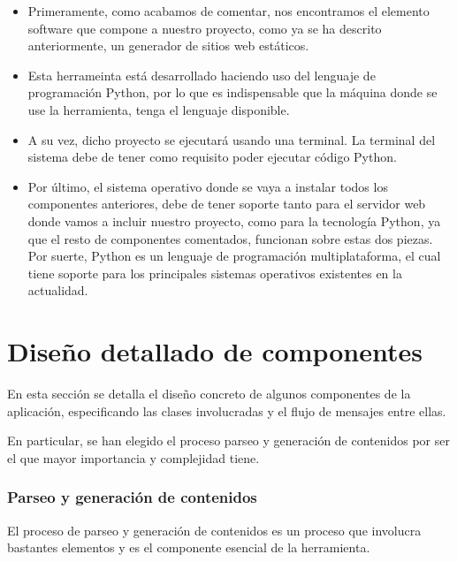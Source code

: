 \begin{itemize}
    \item Primeramente, como acabamos de comentar, nos encontramos el elemento software que
        compone a nuestro proyecto, como ya se ha descrito anteriormente, un generador de sitios web estáticos.
    \item Esta herrameinta está desarrollado haciendo uso del lenguaje de programación Python, por lo que es
        indispensable que la máquina donde se use la herramienta, tenga el lenguaje disponible.
    \item A su vez, dicho proyecto se ejecutará usando una terminal. La terminal del sistema debe de
        tener como requisito poder ejecutar código Python.
    \item Por último, el sistema operativo donde se vaya a instalar todos los componentes anteriores,
        debe de tener soporte tanto para el servidor web donde vamos a incluir nuestro proyecto,
        como para la tecnología Python, ya que el resto de componentes comentados, funcionan
        sobre estas dos piezas. Por suerte, Python es un lenguaje de programación multiplataforma,
        el cual tiene soporte para los principales sistemas operativos existentes en la actualidad.
\end{itemize}


\section{Diseño detallado de componentes}

En esta sección se detalla el diseño concreto de algunos componentes de la aplicación,
especificando las clases involucradas y el flujo de mensajes entre ellas.

En particular, se han elegido el proceso parseo y generación de contenidos
por ser el que mayor importancia y complejidad tiene.

\subsubsection{Parseo y generación de contenidos}

El proceso de parseo y generación de contenidos es un proceso que involucra bastantes
elementos y es el componente esencial de la herramienta.

